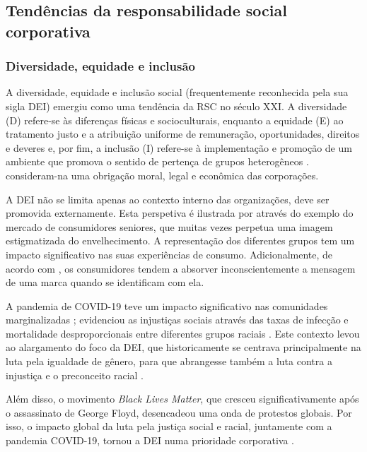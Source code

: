 \documentclass[portuguese]{textolivre}
\begin{document}
\subsection{Tendências da responsabilidade social corporativa}\label{sec-organizacao}
\subsubsection{Diversidade, equidade e inclusão}
A diversidade, equidade e inclusão social (frequentemente reconhecida pela sua sigla DEI) emergiu como uma tendência da RSC no século XXI.  A diversidade (D) refere-se às diferenças físicas e socioculturais, enquanto a equidade (E) ao tratamento justo e a atribuição uniforme de remuneração, oportunidades, direitos e deveres e, por fim, a inclusão (I) refere-se à implementação e promoção de um ambiente que promova o sentido de pertença de grupos heterogêneos \cite{ferraro_embracing_2023}. \textcite{ferraro_embracing_2023} consideram-na uma obrigação moral, legal e econômica das corporações. 

A DEI não se limita apenas ao contexto interno das organizações, deve ser promovida externamente. Esta perspetiva é ilustrada por \textcite{barnhart_who_2013} através do exemplo do mercado de consumidores seniores, que muitas vezes perpetua uma imagem estigmatizada do envelhecimento. A representação dos diferentes grupos tem um impacto significativo nas suas experiências de consumo. Adicionalmente, de acordo com \textcite{ferraro_embracing_2023}, os consumidores tendem a absorver inconscientemente a mensagem de uma marca quando se identificam com ela. 

A pandemia de COVID-19 teve um impacto significativo nas comunidades marginalizadas \cite{creary_improving_2021,govindji_google_2023}; evidenciou as injustiças sociais através das taxas de infecção e mortalidade desproporcionais entre diferentes grupos raciais \cite{addo_double_2020}. Este contexto levou ao alargamento do foco da DEI, que historicamente se centrava principalmente na luta pela igualdade de gênero, para que abrangesse também a luta contra a injustiça e o preconceito racial \cite{creary_improving_2021}.

Além disso, o movimento \textit{Black Lives Matter}, que cresceu significativamente após o assassinato de George Floyd, desencadeou uma onda de protestos globais. Por isso, o impacto global da luta pela justiça social e racial, juntamente com a pandemia COVID-19, tornou a DEI numa prioridade corporativa \cite{human_human_2022}.
\end{document}
